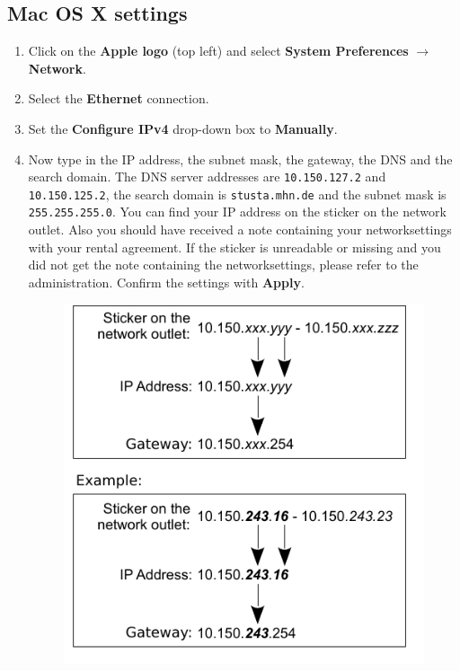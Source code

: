 \documentclass[a4paper,12pt]{scrartcl}
\newcommand{\optemph}[1]{\textbf{#1}}
\begin{document}
\subsection*{Mac OS X settings}
\begin{enumerate}
	\item Click on the \optemph{Apple logo} (top left) and select \optemph{System Preferences} $\rightarrow$ \optemph{Network}.
	\item Select the \optemph{Ethernet} connection.
	\item Set the \optemph{Configure IPv4} drop-down box to \optemph{Manually}.
	\item Now type in the IP address, the subnet mask, the gateway, the DNS and the search domain. The DNS server addresses are \nolinkurl{10.150.127.2} and \nolinkurl{10.150.125.2}, the search domain is \nolinkurl{stusta.mhn.de} and the subnet mask is \nolinkurl{255.255.255.0}. You can find your IP address on the sticker on the network outlet. Also you should have received a note containing your networksettings with your rental agreement. If the sticker is unreadable or missing and you did not get the note containing the networksettings, please refer to the administration. Confirm the settings with \optemph{Apply}.
      \begin{figure}[h!]
      \centering
        \begin{minipage}[c]{0.38\linewidth}
          \centering
          \includegraphics[width=\linewidth,keepaspectratio]{Bilder/IP_Gerneric_EN}

\end{minipage}
\end{figure}
\end{enumerate}
\end{document}
